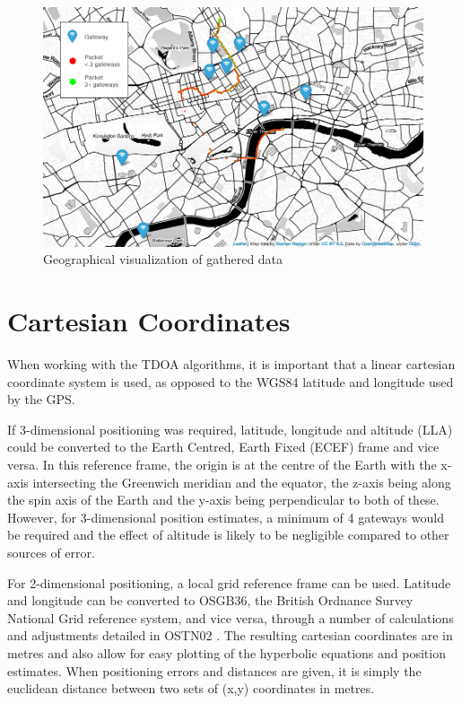 \documentclass[a4paper]{report}
\begin{document}
    \begin{figure}[ht]
    \centering
    \includegraphics[width=15cm]{figures/map_data.png}
    \caption{Geographical visualization of gathered data}
    \label{fig:datamap}
    \end{figure}


  \section{Cartesian Coordinates}
    When working with the TDOA algorithms, it is important that a linear cartesian coordinate system is used, as opposed to the WGS84 latitude and longitude used by the GPS.

    If 3-dimensional positioning was required, latitude, longitude and altitude (LLA) could be converted to the Earth Centred, Earth Fixed (ECEF) frame and vice versa. In this reference frame, the origin is at the centre of the Earth with the x-axis intersecting the Greenwich meridian and the equator, the z-axis being along the spin axis of the Earth and the y-axis being perpendicular to both of these. However, for 3-dimensional position estimates, a minimum of 4 gateways would be required and the effect of altitude is likely to be negligible compared to other sources of error.

    For 2-dimensional positioning, a local grid reference frame can be used. Latitude and longitude can be converted to OSGB36, the British Ordnance Survey National Grid reference system, and vice versa, through a number of calculations and adjustments detailed in OSTN02 \cite{OSTN02}. The resulting cartesian coordinates are in metres and also allow for easy plotting of the hyperbolic equations and position estimates. When positioning errors and distances are given, it is simply the euclidean distance between two sets of (x,y) coordinates in metres.
\end{document}

